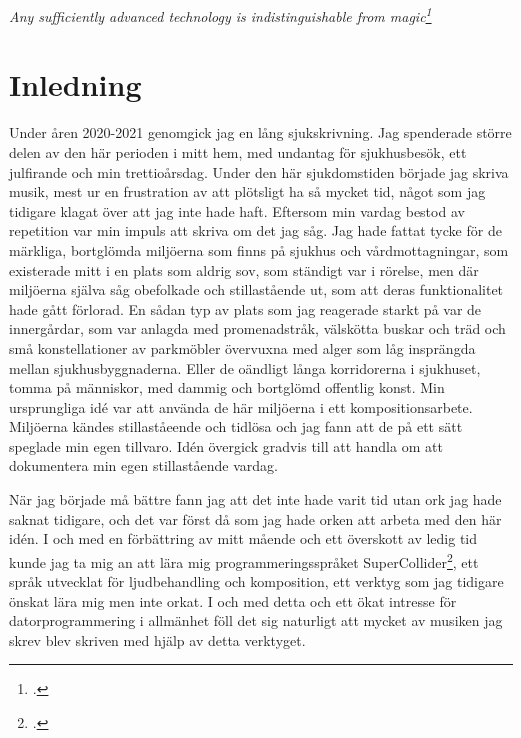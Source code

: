 \documentclass{article}
\begin{document}
\begin{titlepage}
	
\end{titlepage}

\begin{center}
	\hspace{0pt}
	\vfill
	\emph{Any sufficiently advanced technology is indistinguishable from magic\footcite{ArthurCClarkeMagic}}
	\vfill
	\hspace{0pt}
\end{center}
\newpage
\tableofcontents[\large]
\newpage

\section{Inledning}
Under åren 2020-2021 genomgick jag en lång sjukskrivning. Jag spenderade större delen av den här perioden i
mitt hem, med undantag för sjukhusbesök, ett julfirande och min trettioårsdag. Under den här sjukdomstiden
började jag skriva musik, mest ur en frustration av att plötsligt ha så mycket tid, något som jag
tidigare klagat över att jag inte hade haft. Eftersom min vardag bestod av repetition var min impuls att
skriva om det jag såg. Jag hade fattat tycke för de märkliga, bortglömda miljöerna som finns på sjukhus och
vårdmottagningar, som existerade mitt i en plats som aldrig sov, som ständigt var i rörelse, men där miljöerna
själva såg obefolkade och stillastående ut, som att deras funktionalitet hade gått förlorad. En sådan typ av
plats som jag reagerade starkt på var de innergårdar, som var anlagda med promenadstråk, välskötta buskar
och träd och små konstellationer av parkmöbler övervuxna med alger som låg insprängda mellan
sjukhusbyggnaderna. Eller de oändligt långa korridorerna i sjukhuset, tomma på människor, med dammig och
bortglömd offentlig konst. 
Min ursprungliga idé var att använda de här miljöerna i ett kompositionsarbete. 
Miljöerna kändes stillaståeende och tidlösa och jag fann att de på ett sätt speglade min egen tillvaro. Idén
övergick gradvis till att handla om att dokumentera min egen stillastående vardag.

När jag började må bättre fann jag att det inte hade varit tid utan ork jag hade saknat tidigare, och det var
först då som jag hade orken att arbeta med den här idén. I och med en förbättring av
mitt mående och ett överskott av ledig tid kunde jag ta mig an att lära mig programmeringsspråket 
SuperCollider\footcite{sc}, ett språk utvecklat för ljudbehandling och
komposition, ett verktyg som jag tidigare önskat lära mig men inte orkat. I och med detta och ett ökat
intresse för datorprogrammering i allmänhet föll det sig naturligt att mycket av musiken jag skrev blev
skriven med hjälp av detta verktyget.
\end{document}
